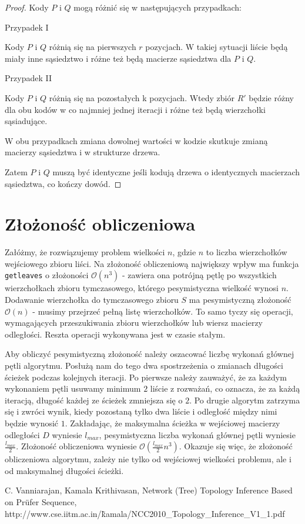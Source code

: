 \documentclass[a4paper,12p]{article}
\begin{document}
\begin{proof}
Kody $P$ i $Q$ mogą różnić się w następujących przypadkach:

Przypadek I

Kody $P$ i $Q$ różnią się na pierwszych $r$ pozycjach. W takiej sytuacji liście będą miały inne sąsiedztwo i różne też będą macierze sąsiedztwa dla $P$ i $Q$.

Przypadek II

Kody $P$ i $Q$ różnią się na pozostałych k pozycjach. Wtedy zbiór $R'$ będzie różny dla obu kodów w co najmniej jednej iteracji i różne też będą wierzchołki sąsiadujące.

W obu przypadkach zmiana dowolnej wartości w kodzie skutkuje zmianą macierzy sąsiedztwa i w strukturze drzewa.

Zatem $P$ i $Q$ muszą być identyczne jeśli kodują drzewa o identycznych macierzach sąsiedztwa, co kończy dowód.
\end{proof}


\section{Złożoność obliczeniowa}

Załóżmy, że rozwiązujemy problem wielkości $n$, gdzie $n$ to liczba wierzchołków wejściowego zbioru liści. Na złożoność obliczeniową największy wpływ ma funkcja \texttt{getleaves} o złożoności $\mathcal{O}(n^3)$ - zawiera ona potrójną pętlę po wszystkich wierzchołkach zbioru tymczasowego, którego pesymistyczna wielkość wynosi $n$. Dodawanie wierzchołka do tymczasowego zbioru $S$ ma pesymistyczną złożoność $\mathcal{O}(n)$ - musimy przejrzeć pełną listę wierzchołków. To samo tyczy się operacji, wymagających przeszukiwania zbioru wierzchołków lub wiersz macierzy odległości. Reszta operacji wykonywana jest w czasie stałym.

Aby obliczyć pesymistyczną złożoność należy oszacować liczbę wykonań głównej pętli algorytmu. Posłużą nam do tego dwa spostrzeżenia o zmianach długości ścieżek podczas kolejnych iteracji. Po pierwsze należy zauważyć, że za każdym wykonaniem pętli usuwamy minimum $2$ liście z rozważań, co oznacza, że za każdą iteracją, długość każdej ze ścieżek zmniejsza się o $2$. Po drugie algorytm zatrzyma się i zwróci wynik, kiedy pozostaną tylko dwa liście i odległość między nimi będzie wynosić $1$. Zakładając, że maksymalna ścieżka w wejściowej macierzy odległości $D$ wyniesie $l_{max}$, pesymistyczna liczba wykonań głównej pętli wyniesie $\frac{l_{max}}{2}$. Złożoność obliczeniowa wyniesie $\mathcal{O}(\frac{l_{max}}{2} n^3)$. Okazuje się więc, że złożoność obliczeniowa algorytmu, zależy nie tylko od wejściowej wielkości problemu, ale i od maksymalnej długości ścieżki.

\newpage

\begin{thebibliography}{1}
 C. Vanniarajan, Kamala Krithivasan, Network (Tree) Topology Inference Based on Prüfer Sequence, http://www.cse.iitm.ac.in/\~kamala/NCC2010\_Topology\_Inference\_V1\_1.pdf
\end{thebibliography}
\end{document}
